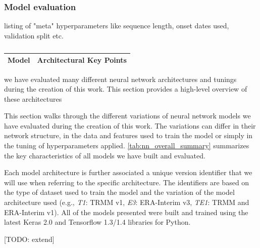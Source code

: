 \subsubsection{Model evaluation}
listing of "meta" hyperparameters like sequence length, onset dates used, validation split etc.

\begin{table}[h]
  \begin{tabularx}{\linewidth}{|c|X|}
    \hline
    Model & Architectural Key Points \\
    \hline

    \hline
  \end{tabularx}
  \caption{}
  \label{tab:evaluation_schemes}
\end{table}




we have evaluated many different neural network architectures and tunings during the creation of this work. This section provides a high-level overview of these architectures


This section walks through the different variations of neural network models we have evaluated during the creation of this work. The variations can differ in their network structure, in the data and features used to train the model or simply in the tuning of hyperparameters applied. \cref{tab:nn_overall_summary} summarizes the key characteristics of all models we have built and evaluated.

Each model architecture is further associated a unique version identifier that we will use when referring to the specific architecture. The identifiers are based on the type of dataset used to train the model and the variation of the model architecture used (e.g., \textit{T1}: TRMM v1, \textit{E3}: ERA-Interim v3, \textit{TE1}: TRMM and ERA-Interim v1). All of the models presented were built and trained using the latest Keras 2.0 and Tensorflow 1.3/1.4 libraries for Python.

[TODO: extend]

